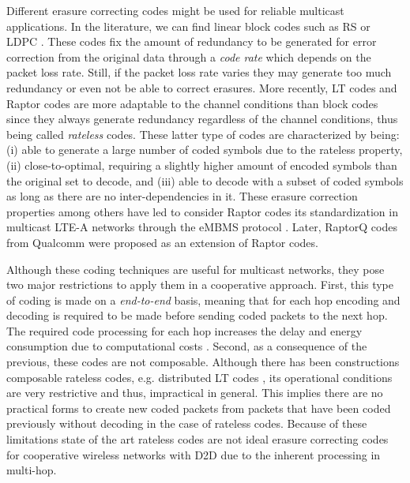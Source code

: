Different erasure correcting codes might be used for reliable multicast applications. In the literature, we can find linear block codes such as \ac{RS} \cite{reed1960polynomial} or \ac{LDPC} \cite{gallager1962low}. These codes fix the amount of redundancy to be generated for error correction from the original data through a \textit{code rate} which depends on the packet loss rate. Still, if the packet loss rate varies they may generate too much redundancy or even not be able to correct erasures. More recently, \ac{LT} codes \cite{luby2002lt} and Raptor codes \cite{shokrollahi2006raptor} are more adaptable to the channel conditions than block codes since they always generate redundancy regardless of the channel conditions, thus being called \textit{rateless} codes. These latter type of codes are characterized by being: (i) able to generate a large number of coded symbols due to the rateless property, (ii) close-to-optimal, requiring a slightly higher amount of encoded symbols than the original set to decode, and (iii) able to decode with a subset of coded symbols as long as there are no inter-dependencies in it. These erasure correction properties among others have led to consider Raptor codes its standardization in multicast \ac{LTE-A} networks through the \ac{eMBMS} protocol \cite{embms2011general}. Later, RaptorQ codes from Qualcomm \cite{qualcomm2011raptorq} were proposed as an extension of Raptor codes.

Although these coding techniques are useful for multicast networks, they pose two major restrictions to apply them in a cooperative approach. First, this type of coding is made on a \textit{end-to-end} basis, meaning that for each hop encoding and decoding is required to be made before sending coded packets to the next hop. The required code processing for each hop increases the delay and energy consumption due to computational costs \cite{toemoeskoezi2015packet}. Second, as a consequence of the previous, these codes are not composable. Although there has been constructions composable rateless codes, e.g. distributed \ac{LT} codes \cite{puducheri2006distributed}, its operational conditions are very restrictive and thus, impractical in general. This implies there are no practical forms to create new coded packets from packets that have been coded previously without decoding in the case of rateless codes. Because of these limitations state of the art rateless codes are not ideal erasure correcting codes for cooperative wireless networks with \ac{D2D} due to the inherent processing in multi-hop.

